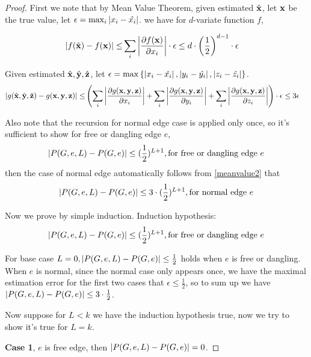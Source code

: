 	\begin{proof}
		First we note that by Mean Value Theorem,
		given estimated $\hat{\bf x}$, let ${\bf x}$ be the true value, let $\epsilon = \max_i{\left\vert x_i - \hat{x_i}\right\vert}$.
		we have for $d$-variate function $f$,

		\begin{align}
		\left\vert f(\hat{\bf x}) - f({\bf x})\right\vert \leq& \sum_i\left\vert \frac{\partial f({\bf x})}{\partial x_i}\right\vert \cdot \epsilon 
		\leq  d\cdot \left( \frac{1}{2} \right)^{d-1} \cdot \epsilon
		\label{meanvalue1}
		\end{align}

		Given estimated $\hat{\bf x},\hat{\bf y},\hat{\bf z}$, let $\epsilon = \max \left\{\left\vert x_i - \hat{x_i}\right\vert, \left\vert y_i - \hat{y_i} \right\vert , \left\vert z_i - \hat{z_i}\right\vert\right\}$.
		\begin{align}
		\left\vert g(\hat{\bf x}, \hat{\bf y}, \hat{\bf z}) - g({\bf x,y,z})\right\vert \leq & \left(  \sum_i\left\vert \frac{\partial g({\bf x,y,z})}{\partial x_i}\right\vert + \sum_i\left\vert \frac{\partial g({\bf x,y,z})}{\partial y_i}\right\vert +  \sum_i\left\vert \frac{\partial g({\bf x,y,z})}{\partial z_i}\right\vert \right) \cdot \epsilon 
		\leq  3\epsilon
		\label{meanvalue2}
		\end{align}


		Also note that the recursion for normal edge case is applied only once, so it's sufficient to show for free or dangling edge $e$,
		\[\left\vert P(G,e,L) - P(G,e)\right\vert \leq (\frac{1}{2})^{L+1}, \textrm{for free or dangling edge $e$}\]
		then the case of normal edge automatically follows from \ref{meanvalue2} that
		\[\left\vert P(G,e,L) - P(G,e)\right\vert \leq 3\cdot(\frac{1}{2})^{L+1}, \textrm{for normal edge $e$}\]

		Now we prove by simple induction.
		Induction hypothesis:
		\[\left\vert P(G,e,L) - P(G,e)\right\vert \leq (\frac{1}{2})^{L+1}, \textrm{for free or dangling edge $e$}\]
		
		For base case $L=0, \left\vert P(G,e,L) - P(G,e)\right\vert \leq \frac{1}{2}$ holds when $e$ is free or dangling. When $e$ is normal, since the normal case only appears once, we have the maximal estimation error for the first two cases that $\epsilon \leq \frac{1}{2}$, so to sum up we have $\left\vert P(G,e,L) - P(G,e)\right\vert \leq 3\cdot\frac{1}{2}$.

		Now suppose for $L<k$ we have the induction hypothesis true, now we try to show it's true for $L=k$.

		{\bf Case 1}, $e$ is free edge, then $\left\vert P(G,e,L) - P(G,e)\right\vert = 0$.


\end{proof}
